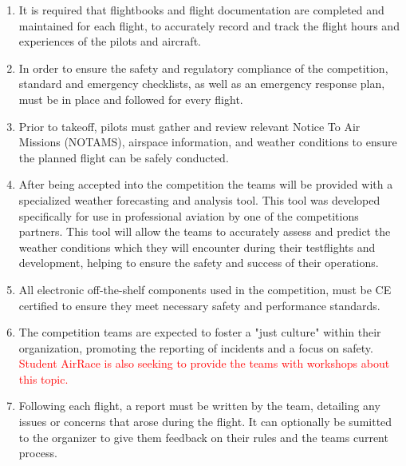 \documentclass{article}
\begin{document}
\begin{enumerate}
  \item It is required that flightbooks and flight documentation are completed and maintained for each flight, to accurately record and track the flight hours and experiences of the pilots and aircraft.
  \item In order to ensure the safety and regulatory compliance of the competition, standard and emergency checklists, as well as an emergency response plan, must be in place and followed for every flight.
  \item Prior to takeoff, pilots must gather and review relevant Notice To Air Missions (NOTAMS), airspace information, and weather conditions to ensure the planned flight can be safely conducted.
  \item After being accepted into the competition the teams will be provided with a specialized weather forecasting and analysis tool. This tool was developed specifically for use in professional aviation by one of the competitions partners. 
  This tool will allow the teams to accurately assess and predict the weather conditions which they will encounter during their testflights and development, helping to ensure the safety and success of their operations. 
  \item All electronic off-the-shelf components used in the competition, must be CE certified to ensure they meet necessary safety and performance standards.
  \item The competition teams are expected to foster a "just culture" within their organization, promoting the reporting of incidents and a focus on safety. \textcolor{red}{Student AirRace is also seeking to provide the teams with workshops about this topic.}
  \item Following each flight, a report must be written by the team, detailing any issues or concerns that arose during the flight. It can optionally be sumitted to the organizer to give them feedback on their rules and the teams current process.
\end{enumerate}
\end{document}
